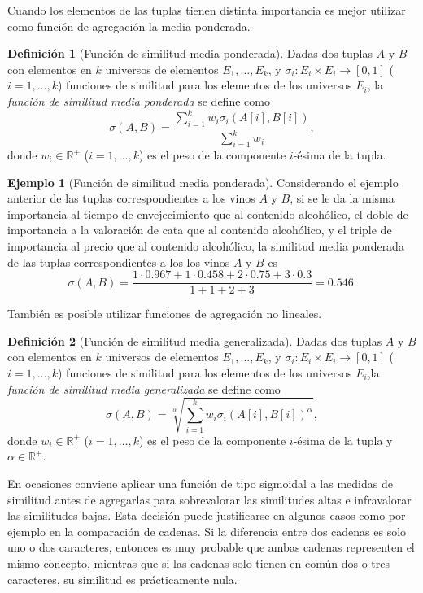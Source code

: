\documentclass[a4paper,10pt,twoside]{article}
\theoremstyle{definition}
\newtheorem{definition}{Definición}
\newtheorem{example}{Ejemplo}
\begin{document}
Cuando los elementos de las tuplas tienen distinta importancia es mejor utilizar como función de agregación la media ponderada.

\begin{definition}[Función de similitud media ponderada]
Dadas dos tuplas $A$ y $B$ con elementos en $k$ universos de elementos $E_1,\ldots,E_k$, y \mbox{$\sigma_i: E_i\times E_i \longrightarrow [0,1]$} ($i=1,\ldots,k$) funciones de similitud para los elementos de los universos $E_i$,
la \emph{función de similitud media ponderada} se define como
\[
\sigma(A,B)=\frac{\sum_{i=1}^{k}w_i\sigma_i(A[i],B[i])}{\sum_{i=1}^{k}w_i},
\]
donde $w_i\in \mathbb{R}^+$ ($i=1,\ldots,k$) es el peso de la componente $i$-ésima de la tupla.
\end{definition}

\begin{example}[Función de similitud media ponderada]
Considerando el ejemplo anterior de las tuplas correspondientes a los vinos $A$ y $B$, si se le da la misma importancia al tiempo de envejecimiento que al contenido alcohólico, el doble de importancia a la valoración de
cata que al contenido alcohólico, y el triple de importancia al precio que al contenido alcohólico, la similitud media ponderada de las tuplas correspondientes a los los vinos $A$ y $B$ es
\[
\sigma(A,B) =
\frac{1\cdot0.967+1\cdot0.458+2\cdot0.75+3\cdot0.3}{1+1+2+3} = 0.546.
\]
\end{example}

También es posible utilizar funciones de agregación no lineales.

\begin{definition}[Función de similitud media generalizada]
Dadas dos tuplas $A$ y $B$ con elementos en $k$ universos de elementos $E_1,\ldots,E_k$, y \mbox{$\sigma_i: E_i\times E_i \longrightarrow [0,1]$} ($i=1,\ldots,k$) funciones de similitud para los elementos de los universos $E_i$,la \emph{función de similitud media generalizada} se define como
\[
\sigma(A,B)=\sqrt[\alpha]{\sum_{i=1}^{k}w_i\sigma_i(A[i],B[i])^\alpha},
\]
donde $w_i\in \mathbb{R}^+$ ($i=1,\ldots,k$) es el peso de la componente $i$-ésima de la tupla y $\alpha\in
\mathbb{R}^+$.
\end{definition}

En ocasiones conviene aplicar una función de tipo sigmoidal a las medidas de similitud antes de agregarlas para sobrevalorar las similitudes altas e infravalorar las similitudes bajas. 
Esta decisión puede justificarse en algunos casos como por ejemplo en la comparación de cadenas.
Si la diferencia entre dos cadenas es solo uno o dos caracteres, entonces es muy probable que ambas cadenas representen el mismo concepto, mientras que si las cadenas solo tienen en común dos o tres caracteres, su similitud es prácticamente nula.
\end{document}
